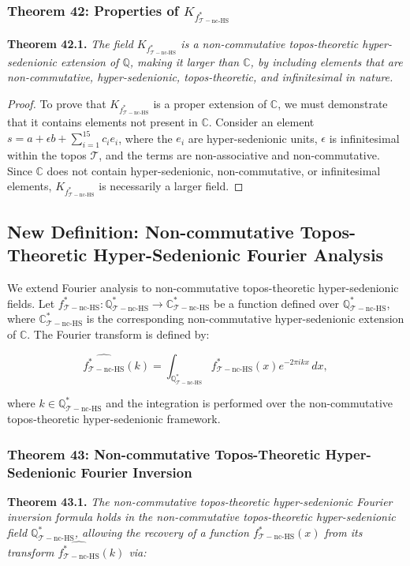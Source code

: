 \documentclass{article}
\begin{document}
\subsubsection{Theorem 42: Properties of \(K_{f_{\mathcal{T}-\text{nc-HS}}^*}\)}
\textbf{Theorem 42.1.} \textit{The field \(K_{f_{\mathcal{T}-\text{nc-HS}}^*}\) is a non-commutative topos-theoretic hyper-sedenionic extension of \(\mathbb{Q}\), making it larger than \(\mathbb{C}\), by including elements that are non-commutative, hyper-sedenionic, topos-theoretic, and infinitesimal in nature.}

\begin{proof}
To prove that \(K_{f_{\mathcal{T}-\text{nc-HS}}^*}\) is a proper extension of \(\mathbb{C}\), we must demonstrate that it contains elements not present in \(\mathbb{C}\). Consider an element \(s = a + \epsilon b + \sum_{i=1}^{15} c_i e_i\), where the \(e_i\) are hyper-sedenionic units, \(\epsilon\) is infinitesimal within the topos \(\mathcal{T}\), and the terms are non-associative and non-commutative. Since \(\mathbb{C}\) does not contain hyper-sedenionic, non-commutative, or infinitesimal elements, \(K_{f_{\mathcal{T}-\text{nc-HS}}^*}\) is necessarily a larger field.
\end{proof}

\subsection{New Definition: Non-commutative Topos-Theoretic Hyper-Sedenionic Fourier Analysis}
We extend Fourier analysis to non-commutative topos-theoretic hyper-sedenionic fields. Let \(f_{\mathcal{T}-\text{nc-HS}}^*: \mathbb{Q}_{\mathcal{T}-\text{nc-HS}}^* \to \mathbb{C}_{\mathcal{T}-\text{nc-HS}}^*\) be a function defined over \(\mathbb{Q}_{\mathcal{T}-\text{nc-HS}}^*\), where \(\mathbb{C}_{\mathcal{T}-\text{nc-HS}}^*\) is the corresponding non-commutative hyper-sedenionic extension of \(\mathbb{C}\). The Fourier transform is defined by:

\[
\widehat{f_{\mathcal{T}-\text{nc-HS}}^*}(k) = \int_{\mathbb{Q}_{\mathcal{T}-\text{nc-HS}}^*} f_{\mathcal{T}-\text{nc-HS}}^*(x) e^{-2\pi i k x} \, dx,
\]

where \(k \in \mathbb{Q}_{\mathcal{T}-\text{nc-HS}}^*\) and the integration is performed over the non-commutative topos-theoretic hyper-sedenionic framework.

\subsubsection{Theorem 43: Non-commutative Topos-Theoretic Hyper-Sedenionic Fourier Inversion}
\textbf{Theorem 43.1.} \textit{The non-commutative topos-theoretic hyper-sedenionic Fourier inversion formula holds in the non-commutative topos-theoretic hyper-sedenionic field \(\mathbb{Q}_{\mathcal{T}-\text{nc-HS}}^*\), allowing the recovery of a function \(f_{\mathcal{T}-\text{nc-HS}}^*(x)\) from its transform \(\widehat{f_{\mathcal{T}-\text{nc-HS}}^*}(k)\) via:}
\end{document}
